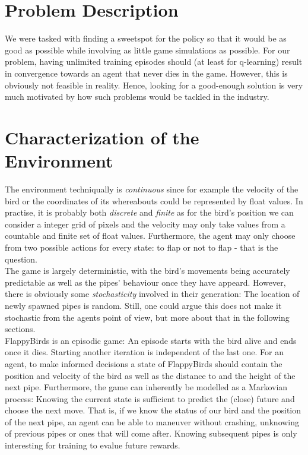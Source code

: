 \documentclass[a4paper,12pt]{article}
\begin{document}
\section{Problem Description}
We were tasked with finding a sweetspot for the policy so that it would be as good as possible while involving as 
little game simulations as
possible. For our problem, having unlimited training episodes should (at least for q-learning) result in convergence towards an agent 
that never dies in the game.
However, this is obviously not feasible in reality. Hence, looking for a good-enough solution is very much motivated by
how such problems would be tackled in the industry.

\section{Characterization of the Environment}
The environment techniqually is \textit{continuous} since for example the velocity of the bird or the coordinates of its whereabouts
could be represented by float values. In practise, it is probably both \textit{discrete} and \textit{finite} as for the bird's position we can consider a 
integer grid of pixels and the velocity may only take values from a countable and finite set of float values. Furthermore, the agent
may only choose from two possible actions for every state: to flap or not to flap - that is the question.
\\
The game is largely deterministic, with the bird's movements being accurately predictable as well as the pipes' behaviour once they have
appeard.
However, there is obviously some \textit{stochasticity} involved in their generation: 
The location of newly spawned pipes is random. Still, one could argue
this does not make it stochastic from the agents point of view, but more about that in the following sections.
\\
FlappyBirds is an episodic game: An episode starts with the bird alive and ends once it dies. Starting another iteration is independent
of the last one.
For an agent, to make informed decisions a state of FlappyBirds should contain the position and velocity of the bird as well as the distance to
and the height of the next pipe.
Furthermore, the game can inherently be modelled as a Markovian process: Knowing the current state is sufficient to predict the (close) future
and choose the next move. That is, if we know the status of our bird and the position of the next pipe, an agent can be able
to maneuver without crashing, unknowing of previous pipes or ones that will come after. Knowing subsequent pipes is only 
interesting for training to evalue future rewards.
\end{document}
